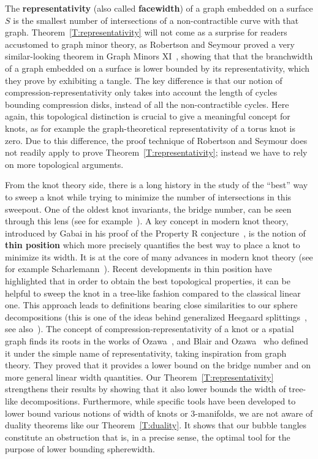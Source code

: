 \documentclass[11pt,a4paper]{article}
\begin{document}
The \textbf{representativity} (also called \textbf{facewidth}) of a graph embedded on a surface $S$ is the smallest number of intersections of a non-contractible curve with that graph. Theorem~\ref{T:representativity} will not come as a surprise for readers accustomed to graph minor theory, as Robertson and Seymour proved a very similar-looking theorem in Graph Minors XI~\cite[Theorem~4.1]{Graph_minors_XI}, showing that that the branchwidth of a graph embedded on a surface is lower bounded by its representativity, which they prove by exhibiting a tangle. The key difference is that our notion of compression-representativity only takes into account the length of cycles bounding compression disks, instead of all the non-contractible cycles. Here again, this topological distinction is crucial to give a meaningful concept for knots, as for example the graph-theoretical representativity of a torus knot is zero. Due to this difference, the proof technique of Robertson and Seymour does not readily apply to prove Theorem~\ref{T:representativity}; instead we have to rely on more topological arguments.

From the knot theory side, there is a long history in the study of the ``best'' way to sweep a knot while trying to minimize the number of intersections in this sweepout. One of the oldest knot invariants, the bridge number, can be seen through this lens (see for example~\cite{schultens}). A key concept in modern knot theory, introduced by Gabai in his proof of the Property R conjecture~\cite{gabai}, is the notion of \textbf{thin position} which more precisely quantifies the best way to place a knot to  minimize its width. It is at the core of many advances in modern knot theory (see for example Scharlemann~\cite{scharlemann}). Recent developments in thin position have highlighted that in order to obtain the best topological properties, it can be helpful to sweep the knot in a tree-like fashion compared to the classical linear one. This approach leads to definitions bearing close similarities to our sphere decompositions (this is one of the ideas behind generalized Heegaard splittings~\cite{scharlemannthompson,genHeegaard}, see also~\cite{Hayashi_spliting,widthtrees,tayloradditive}). The concept of compression-representativity of a knot or a spatial graph finds its roots in the works of Ozawa~\cite{ozawa}, and Blair and Ozawa~\cite{blairozawa} who defined it under the simple name of representativity, taking inspiration from graph theory. They proved that it provides a lower bound on the bridge number and on more general linear width quantities. Our Theorem~\ref{T:representativity} strengthens their results by showing that it also lower bounds the width of tree-like decompositions. Furthermore, while specific tools have been developed to lower bound various notions of width of knots or $3$-manifolds, we are not aware of duality theorems like our Theorem~\ref{T:duality}. It shows that our bubble tangles constitute an obstruction that is, in a precise sense, the optimal tool for the purpose of lower bounding spherewidth.
\end{document}
